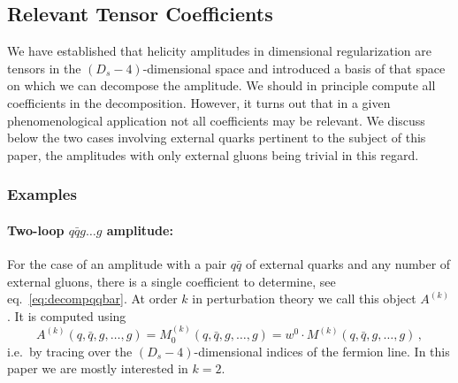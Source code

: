 \subsection{Relevant Tensor Coefficients}
\label{sec:relevant_tensors}

We have established that helicity amplitudes in dimensional
regularization are tensors in the $(D_s-4)$-dimensional space and
introduced a basis of that space on which we can decompose the
amplitude.  We should in
principle compute all coefficients in the decomposition. However, it
turns out that in a given phenomenological application not all
coefficients may be relevant. We discuss below the two cases
involving external quarks pertinent to the subject of this 
paper, the amplitudes with only external gluons being trivial in
this regard.


\subsubsection{Examples}

\paragraph{Two-loop $q\bar qg\ldots g$ amplitude:}
For the case of an amplitude with a pair $q\bar q$ of external
quarks and any number of external gluons,
there is a single coefficient to determine, 
see eq.~\eqref{eq:decompqqbar}. At order $k$ in perturbation
theory we call this object $A^{(k)}$. It is
computed using
\begin{equation}\label{eq:qqProj}
    A^{(k)}(q,\bar q,g,\ldots,g)=M^{(k)}_0(q,\bar q,g,\ldots,g) =
	w^0\cdot M^{(k)}(q,\bar q,g,\ldots,g)\,,
\end{equation}
i.e.\ by
tracing over the $(D_s-4)$-dimensional indices of the
fermion line. In this paper we are mostly interested in $k=2$.


